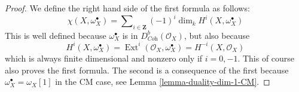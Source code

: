\documentclass[10pt,a4paper]{amsart}
\theoremstyle{plain}
\theoremstyle{definition}
\theoremstyle{remark}
\numberwithin{equation}{subsection}
\def\Ext{\mathop{\mathrm{Ext}}\nolimits}
\begin{document}
\begin{proof}
We define the right hand side of the first formula as follows:
$$
\chi(X, \omega_X^\bullet) =
\sum\nolimits_{i \in \mathbf{Z}} (-1)^i\dim_k H^i(X, \omega_X^\bullet)
$$
This is well defined because $\omega_X^\bullet$ is in
$D^b_{\textit{Coh}}(\mathcal{O}_X)$, but also because
$$
H^i(X, \omega_X^\bullet) =
\Ext^i(\mathcal{O}_X, \omega_X^\bullet) =
H^{-i}(X, \mathcal{O}_X)
$$
which is always finite dimensional and nonzero only if $i = 0, -1$.
This of course also proves the first formula. The second is a consequence
of the first because $\omega_X^\bullet = \omega_X[1]$ in the CM case, see
Lemma \ref{lemma-duality-dim-1-CM}.
\end{proof}
\end{document}

